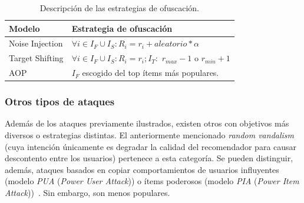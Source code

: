 \begin{table}
\small
\begin{centering}
	
		\begin{tabular}{@{}l l@{}}
		\toprule
		\textbf{Modelo} & \textbf{Estrategia de ofuscación}\\ 
		\midrule
			
		Noise Injection & $\forall i \in I_F \cup I_S: R_i = r_i + aleatorio * \alpha$\\
		Target Shifting & $\forall i \in I_F \cup I_S: R_i = r_i; I_T:$ $r_{max}-1$ o $r_{min}+1$\\
		AOP & $I_F$ escogido del top ítems más populares.\\
			
		\bottomrule
		\end{tabular}

\end{centering}
\caption{Descripción de las estrategias de ofuscación.}	\label{tabla_descripcion_estrategias_ofuscación}
\end{table}

\subsubsection{Otros tipos de ataques}

Además de los ataques previamente ilustrados, existen otros con objetivos más diversos o estrategias distintas. El anteriormente mencionado \textit{random vandalism} (cuya intención únicamente es degradar la calidad del recomendador para causar descontento entre los usuarios) pertenece a esta categoría. Se pueden distinguir, además, ataques basados en copiar comportamientos de usuarios influyentes (modelo \textit{PUA} (\textit{Power User Attack})) o ítems poderosos (modelo \textit{PIA} (\textit{Power Item Attack}))~\cite{mingdan2018ShillingAttacksAReview}. Sin embargo, son menos populares.


